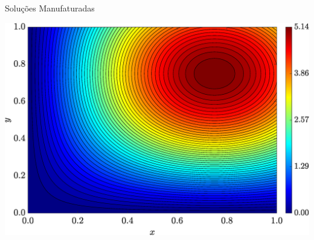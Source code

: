 \begin{frame}{Soluções Manufaturadas}
\begin{minipage}{0.31\textwidth}
        \label{fig_solexaTxyCase111}
    \end{minipage}
    \hfill
    \begin{minipage}{0.31\textwidth}
        \centering
        \includegraphics[width=\textwidth]{Figures/Exact_Map_NormErr_2nd_Betann_0.1_Re_1_Wi_1_epsilon_0_xi_0_alphaG_0_Dt_1e-06_at_0.05_tipsim_1_MMS_12_Tyy.eps}
        \label{fig_solexaTyyCase111}
    \end{minipage}
\end{frame}

